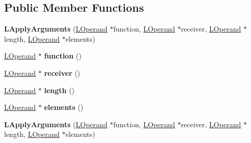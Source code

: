 \subsection*{Public Member Functions}
\begin{DoxyCompactItemize}
\item 
{\bfseries L\+Apply\+Arguments} (\hyperlink{classv8_1_1internal_1_1_l_operand}{L\+Operand} $\ast$function, \hyperlink{classv8_1_1internal_1_1_l_operand}{L\+Operand} $\ast$receiver, \hyperlink{classv8_1_1internal_1_1_l_operand}{L\+Operand} $\ast$length, \hyperlink{classv8_1_1internal_1_1_l_operand}{L\+Operand} $\ast$elements)\hypertarget{classv8_1_1internal_1_1_l_apply_arguments_a03722f1b30078ec905687e48dd73c80d}{}\label{classv8_1_1internal_1_1_l_apply_arguments_a03722f1b30078ec905687e48dd73c80d}

\item 
\hyperlink{classv8_1_1internal_1_1_l_operand}{L\+Operand} $\ast$ {\bfseries function} ()\hypertarget{classv8_1_1internal_1_1_l_apply_arguments_af7fa90a86d06b14c9991f9c68115415b}{}\label{classv8_1_1internal_1_1_l_apply_arguments_af7fa90a86d06b14c9991f9c68115415b}

\item 
\hyperlink{classv8_1_1internal_1_1_l_operand}{L\+Operand} $\ast$ {\bfseries receiver} ()\hypertarget{classv8_1_1internal_1_1_l_apply_arguments_a6cd58169b6ce998cb4a7fadaebdf8ae5}{}\label{classv8_1_1internal_1_1_l_apply_arguments_a6cd58169b6ce998cb4a7fadaebdf8ae5}

\item 
\hyperlink{classv8_1_1internal_1_1_l_operand}{L\+Operand} $\ast$ {\bfseries length} ()\hypertarget{classv8_1_1internal_1_1_l_apply_arguments_a7184d82b892039d6cd4cae3b4d9f3f9d}{}\label{classv8_1_1internal_1_1_l_apply_arguments_a7184d82b892039d6cd4cae3b4d9f3f9d}

\item 
\hyperlink{classv8_1_1internal_1_1_l_operand}{L\+Operand} $\ast$ {\bfseries elements} ()\hypertarget{classv8_1_1internal_1_1_l_apply_arguments_acb08ae582ad76ef25684e2361409c0e4}{}\label{classv8_1_1internal_1_1_l_apply_arguments_acb08ae582ad76ef25684e2361409c0e4}

\item 
{\bfseries L\+Apply\+Arguments} (\hyperlink{classv8_1_1internal_1_1_l_operand}{L\+Operand} $\ast$function, \hyperlink{classv8_1_1internal_1_1_l_operand}{L\+Operand} $\ast$receiver, \hyperlink{classv8_1_1internal_1_1_l_operand}{L\+Operand} $\ast$length, \hyperlink{classv8_1_1internal_1_1_l_operand}{L\+Operand} $\ast$elements)\hypertarget{classv8_1_1internal_1_1_l_apply_arguments_a03722f1b30078ec905687e48dd73c80d}{}\label{classv8_1_1internal_1_1_l_apply_arguments_a03722f1b30078ec905687e48dd73c80d}


\end{DoxyCompactItemize}
